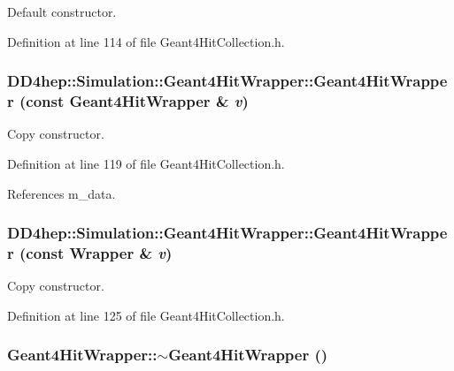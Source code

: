 Default constructor. 

Definition at line 114 of file Geant4HitCollection.h.\hypertarget{class_d_d4hep_1_1_simulation_1_1_geant4_hit_wrapper_a067b6f5a7e88d4f85d6554b563047916}{
\subsubsection[{Geant4HitWrapper}]{\setlength{\rightskip}{0pt plus 5cm}DD4hep::Simulation::Geant4HitWrapper::Geant4HitWrapper (const {\bf Geant4HitWrapper} \& {\em v})}}
\label{class_d_d4hep_1_1_simulation_1_1_geant4_hit_wrapper_a067b6f5a7e88d4f85d6554b563047916}


Copy constructor. 

Definition at line 119 of file Geant4HitCollection.h.

References m\_\-data.\hypertarget{class_d_d4hep_1_1_simulation_1_1_geant4_hit_wrapper_a4582891698f74e839dadd7cb78ae00e4}{
\subsubsection[{Geant4HitWrapper}]{\setlength{\rightskip}{0pt plus 5cm}DD4hep::Simulation::Geant4HitWrapper::Geant4HitWrapper (const {\bf Wrapper} \& {\em v})}}
\label{class_d_d4hep_1_1_simulation_1_1_geant4_hit_wrapper_a4582891698f74e839dadd7cb78ae00e4}


Copy constructor. 

Definition at line 125 of file Geant4HitCollection.h.\hypertarget{class_d_d4hep_1_1_simulation_1_1_geant4_hit_wrapper_ae5a3a00858bb69ec71673f7286be2bab}{
\subsubsection[{$\sim$Geant4HitWrapper}]{\setlength{\rightskip}{0pt plus 5cm}Geant4HitWrapper::$\sim$Geant4HitWrapper ()}}
\label{class_d_d4hep_1_1_simulation_1_1_geant4_hit_wrapper_ae5a3a00858bb69ec71673f7286be2bab}


